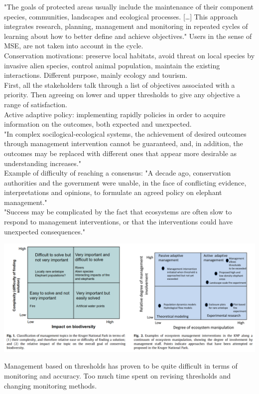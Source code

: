 \documentclass[12pt]{article}
\begin{document}
"The goals of protected areas usually include the maintenance of their component species, communities,
landscapes and ecological processes. [\dots] This approach integrates research, planning, management and monitoring
in repeated cycles of learning about how to better define and
achieve objectives." Users in the sense of MSE, are not taken into account in the cycle.\\
Conservation motivations: preserve local habitats, avoid threat on local species by invasive alien species, control animal population, maintain the existing interactions. Different purpose, mainly ecology and tourism.\\
First, all the stakeholders talk through a list of objectives associated with a priority. Then agreeing on lower and upper thresholds to give any objective a range of satisfaction.\\
Active adaptive policy: implementing rapidly policies in order to acquire information on the outcomes, both expected and unexpected.\\
"In complex socilogical-ecological systems, the achievement of desired outcomes through management intervention cannot be guaranteed, and, in addition, the outcomes may be replaced with
different ones that appear more desirable as understanding increases."\\
Example of difficulty of reaching a consensus: "A decade ago, conservation authorities and the government
were unable, in the face of conflicting evidence, interpretations
and opinions, to formulate an agreed policy on elephant management."\\
"Success may be complicated by the
fact that ecosystems are often slow to respond to management
interventions, or that the interventions could have unexpected
consequences."
\begin{center}
\includegraphics[scale=0.3]{managementClassification.png}
\end{center}
Management based on thresholds has proven to be quite difficult in terms of monitoring and accuracy.
Too much time spent on revising thresholds and changing monitoring methods.
\end{document}
